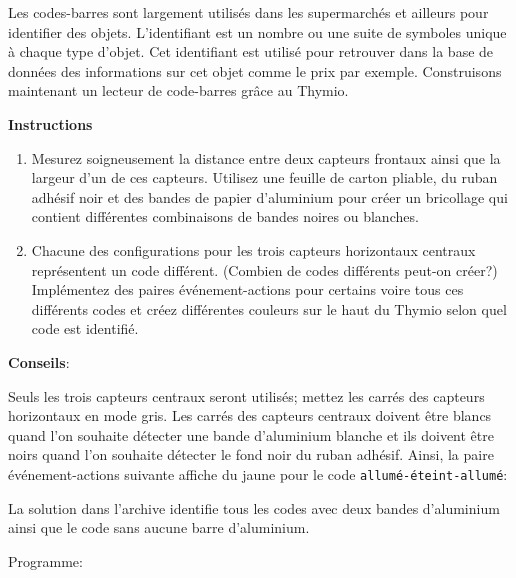 \label{ch.barcode}

Les codes-barres sont largement utilisés dans les supermarchés et ailleurs pour identifier
des objets. L'identifiant est un nombre ou une suite de symboles unique à chaque type d'objet.
Cet identifiant est utilisé pour retrouver dans la base de données des informations sur
cet objet comme le prix par exemple.
Construisons maintenant un lecteur de code-barres grâce au Thymio.

\textbf{Instructions}

\begin{enumerate}
\item Mesurez soigneusement la distance entre deux capteurs frontaux ainsi que la largeur d'un de ces
    capteurs.
    Utilisez une feuille de carton pliable, du ruban adhésif noir et des bandes de papier d'aluminium
    pour créer un bricollage qui contient différentes combinaisons de bandes noires ou blanches.

\begin{center}
\end{center}

\item Chacune des configurations pour les trois capteurs horizontaux centraux
    représentent un code différent. (Combien de codes différents peut-on créer?)
    Implémentez des paires événement-actions pour certains voire tous ces différents codes
    et créez différentes couleurs sur le haut du Thymio selon quel code est identifié.

\end{enumerate}

\textbf{Conseils}:

Seuls les trois capteurs centraux seront utilisés; mettez les carrés des capteurs horizontaux
en mode gris.
Les carrés des capteurs centraux doivent être blancs quand l'on souhaite détecter une bande d'aluminium blanche
et ils doivent être noirs quand l'on souhaite détecter le fond noir du ruban adhésif.
Ainsi, la paire événement-actions suivante affiche du jaune pour le code \texttt{allumé-éteint-allumé}:


La solution dans l'archive identifie tous les codes avec deux bandes d'aluminium ainsi que 
le code sans aucune barre d'aluminium.

{\raggedleft \hfill Programme: }
